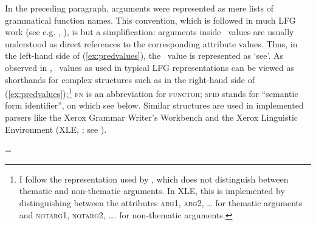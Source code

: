 \documentclass[output=paper,hidelinks]{langscibook}
\begin{document}
 In the preceding paragraph, arguments were represented as mere lists of grammatical function names. This convention, which is followed in much LFG work (see e.g. \citealt{dalrymple01}, \citealt{DLM:LFG}), is but a simplification: arguments inside \PRED\ values are usually understood as direct references to the corresponding attribute values. Thus, in the left-hand side of (\ref{ex:predvalues}), the \PRED\ value is represented as `see'. As observed in \textcite[63]{Kuhn-CSLI-book}, \PRED\ values as used in typical LFG representations can be viewed as shorthands for complex structures such as in the right-hand side of (\ref{ex:predvalues});\footnote{I follow the representation used by \textcite{Kuhn-CSLI-book}, which does not distinguish between thematic and non-thematic arguments. In XLE, this is implemented by distinguishing between the attributes \textsc{arg1}, \textsc{arg2}, … for thematic arguments and \textsc{notarg1}, \textsc{notarg2}, …. for non-thematic arguments.} \textsc{fn} is an abbreviation for \textsc{functor}; \textsc{sfid} stands for ``semantic form identifier'', on which see below. Similar structures are used in implemented parsers like the Xerox Grammar Writer's Workbench \parencite{kaplanmaxwell96} and the Xerox Linguistic Environment (XLE, \cite{xledoc}; see ).

 \begin{exe}
 \ex\label{ex:predvalues}
 =
 \end{exe}
\end{document}
